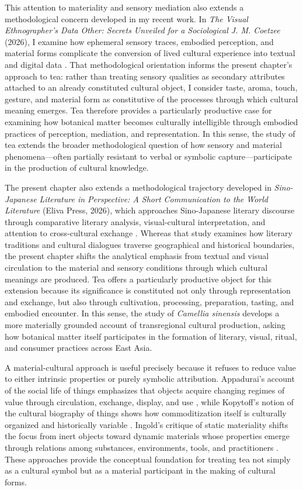 \documentclass[numbers]{IntechOpen-Book}
\begin{document}
This attention to materiality and sensory mediation also extends a methodological concern developed in my recent work. In \textit{The Visual Ethnographer's Data Other: Secrets Unveiled for a Sociological J. M. Coetzee} (2026), I examine how ephemeral sensory traces, embodied perception, and material forms complicate the conversion of lived cultural experience into textual and digital data \cite{zhucoetzee}. That methodological orientation informs the present chapter's approach to tea: rather than treating sensory qualities as secondary attributes attached to an already constituted cultural object, I consider taste, aroma, touch, gesture, and material form as constitutive of the processes through which cultural meaning emerges. Tea therefore provides a particularly productive case for examining how botanical matter becomes culturally intelligible through embodied practices of perception, mediation, and representation. In this sense, the study of tea extends the broader methodological question of how sensory and material phenomena---often partially resistant to verbal or symbolic capture---participate in the production of cultural knowledge.

The present chapter also extends a methodological trajectory developed in \textit{Sino-Japanese Literature in Perspective: A Short Communication to the World Literature} (Eliva Press, 2026), which approaches Sino-Japanese literary discourse through comparative literary analysis, visual-cultural interpretation, and attention to cross-cultural exchange \cite{zhusinojapanese}. Whereas that study examines how literary traditions and cultural dialogues traverse geographical and historical boundaries, the present chapter shifts the analytical emphasis from textual and visual circulation to the material and sensory conditions through which cultural meanings are produced. Tea offers a particularly productive object for this extension because its significance is constituted not only through representation and exchange, but also through cultivation, processing, preparation, tasting, and embodied encounter. In this sense, the study of \textit{Camellia sinensis} develops a more materially grounded account of transregional cultural production, asking how botanical matter itself participates in the formation of literary, visual, ritual, and consumer practices across East Asia.

A material-cultural approach is useful precisely because it refuses to reduce value to either intrinsic properties or purely symbolic attribution. Appadurai's account of the social life of things emphasizes that objects acquire changing regimes of value through circulation, exchange, display, and use \cite{appadurai}, while Kopytoff's notion of the cultural biography of things shows how commoditization itself is culturally organized and historically variable \cite{kopytoff}. Ingold's critique of static materiality shifts the focus from inert objects toward dynamic materials whose properties emerge through relations among substances, environments, tools, and practitioners \cite{ingoldmaterials,ingoldmaking}. These approaches provide the conceptual foundation for treating tea not simply as a cultural symbol but as a material participant in the making of cultural forms.
\end{document}

